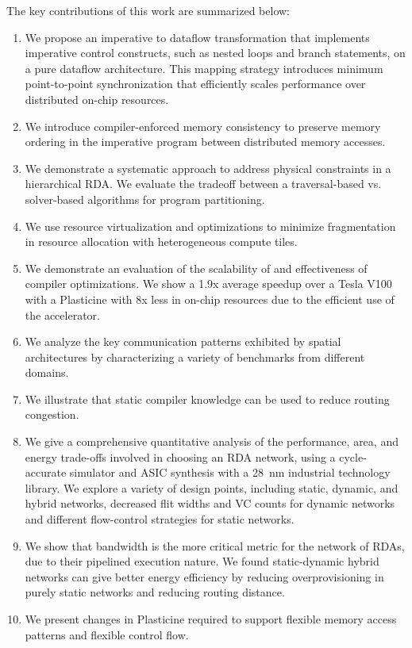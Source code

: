 The key contributions of this work are summarized below:
\begin{enumerate}
    \item We propose an imperative to dataflow transformation that implements imperative control constructs, such as nested loops and branch statements, on a pure dataflow architecture.
      This mapping strategy introduces minimum point-to-point synchronization that efficiently scales performance over distributed on-chip resources.
    \item We introduce compiler-enforced memory consistency to preserve memory ordering in the imperative program between distributed memory accesses.
    \item We demonstrate a systematic approach to address physical constraints in a hierarchical RDA.
      We evaluate the tradeoff between a traversal-based vs. solver-based algorithms for program partitioning. 
    \item We use resource virtualization and optimizations to minimize fragmentation in resource allocation with heterogeneous compute tiles.
    \item We demonstrate an evaluation of the scalability of \name and effectiveness of compiler optimizations.
      We show a 1.9x average speedup over a Tesla V100 with a Plasticine with 8x less in on-chip
      resources due to the efficient use of the accelerator.
    \item We analyze the key communication patterns exhibited by spatial architectures by characterizing a variety of benchmarks from different domains.
    \item We illustrate that static compiler knowledge can be used to reduce routing congestion.
    \item We give a comprehensive quantitative analysis of the performance, area, and energy trade-offs 
      involved in choosing an RDA network, using a cycle-accurate simulator and ASIC synthesis with a \SI{28}{nm} industrial technology library.
      We explore a variety of design points, including static, dynamic, and hybrid networks, decreased flit widths and VC counts for dynamic networks and different flow-control strategies for static networks.
    \item We show that bandwidth is the more critical metric for the network of RDAs, due to their pipelined execution nature. We found static-dynamic hybrid networks can give better energy efficiency by reducing overprovisioning in purely static networks and reducing routing distance.
    \item We present changes in Plasticine required to support flexible memory access patterns and flexible control flow.
\end{enumerate}

